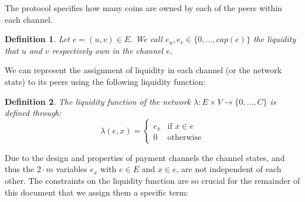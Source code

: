 \documentclass[10pt,twocolumn]{article}
\newtheorem{definition}{Definition}[section]
\begin{document}
The protocol specifies how many coins are owned by each of the peers within each channel.
\begin{definition}
  Let \(e = (u, v) \in E\). 
  We call \(e_u, e_v \in \{0, \dots, cap(e)\}\) the liquidity that \(u\) and \(v\) respectively own in the channel \(e\).
\end{definition}

We can represent the assignment of liquidity in each channel (or the network state) to its peers using the following liquidity function:
\begin{definition}
  \label{def:liquidityFunction}
  The liquidity function of the network $\lambda: E\times V \longrightarrow \{0,\dots,C\}$ is defined through:
    \begin{equation}
    \lambda(e,x)= \begin{cases}
      e_x & \text{if $x\in e$}\\
      0 & \text{otherwise}
    \end{cases}
    \end{equation}
\end{definition}



Due to the design and properties of payment channels the channel states, and thus the \(2 \cdot m\) variables \(e_x\) with \(e \in E\) and \(x \in e\), are not independent of each other.
The constraints on the liquidity function are so crucial for the remainder of this document that we assign them a specific term: 
\end{document}
